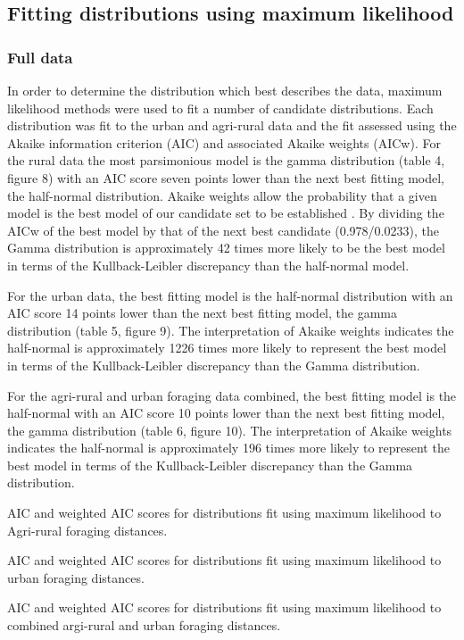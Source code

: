 \documentclass[11pt,usenames,dvipsnames,a4paper]{article}
\begin{document}
\subsection{Fitting distributions using maximum likelihood}

\subsubsection{Full data}

\begin{linenumbers}
\hspace{\parindent}
In order to determine the distribution which best describes the data, maximum likelihood methods were used to fit a number of candidate distributions. Each distribution was fit to the urban and agri-rural data and the fit assessed using the Akaike information criterion (AIC) and associated Akaike weights (AICw). For the rural data the most parsimonious model is the gamma distribution (table 4, figure 8) with an AIC score seven points lower than the next best fitting model, the half-normal distribution. Akaike weights allow the probability that a given model is the best model of our candidate set to be established \citep{Burnham2004}. By dividing the AICw of the best model by that of the next best candidate (0.978/0.0233), the Gamma distribution is approximately 42 times more likely to be the best model in terms of the Kullback-Leibler discrepancy than the half-normal model.

For the urban data, the best fitting model is the half-normal distribution with an AIC score 14 points lower than the next best fitting model, the gamma distribution (table 5, figure 9). The interpretation of Akaike weights indicates the half-normal is approximately 1226 times more likely to represent the best model in terms of the Kullback-Leibler discrepancy than the Gamma distribution.

For the agri-rural and urban foraging data combined, the best fitting model is the half-normal with an AIC score 10 points lower than the next best fitting model, the gamma distribution (table 6, figure 10). The interpretation of Akaike weights indicates the half-normal is approximately 196 times more likely to represent the best model in terms of the Kullback-Leibler discrepancy than the Gamma distribution.
\end{linenumbers}

\begin{table}[H]
	\centering
	\caption{AIC and weighted AIC scores for distributions fit using maximum likelihood to Agri-rural foraging distances.}
	
\end{table}
\begin{table}[H]
	\centering
	\caption{AIC and weighted AIC scores for distributions fit using maximum likelihood to urban foraging distances.}
	
\end{table}
\begin{table}[H]
	\centering
	\caption{AIC and weighted AIC scores for distributions fit using maximum likelihood to combined argi-rural and urban foraging distances.}
	
\end{table}
\end{document}
